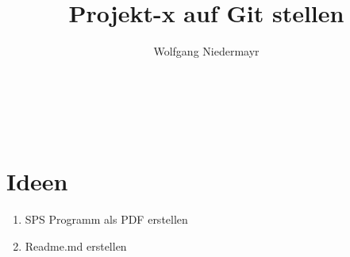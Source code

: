\documentclass[
footnotes=multiple,
parskip=half,
numbers=noendperiod
]{scrartcl}
\author{Wolfgang Niedermayr}
\title{Projekt-x auf Git stellen}
\begin{document}
\maketitle %
~%
\\ %
\\ %
\section{Ideen} %
\label{sec:Ideen}
\begin{enumerate}
	\item SPS Programm als PDF erstellen	
	\item Readme.md erstellen
\end{enumerate}
\end{document}

